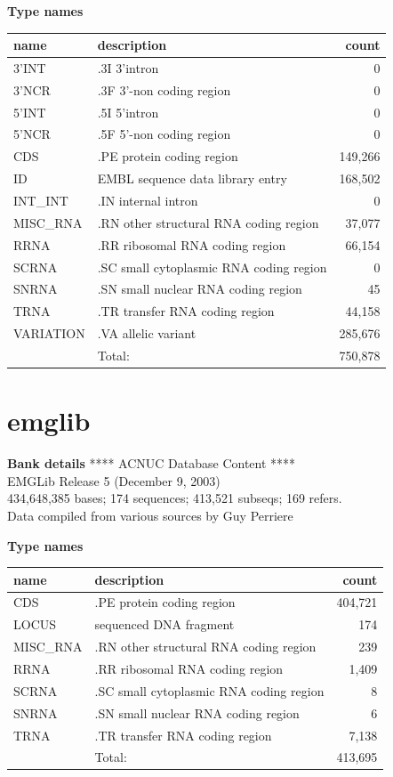 \documentclass{article}
\begin{document}
\begin{Schunk}
\textbf{Type names}
\noindent\begin{tabular}{llr}
\hline \hline
name & description & count \\
\hline
3'INT  &  .3I 3'intron  &  0 \\
3'NCR  &  .3F  3'-non coding region  &  0 \\
5'INT  &  .5I 5'intron  &  0 \\
5'NCR  &  .5F  5'-non coding region  &  0 \\
CDS  &  .PE protein coding region  &  149,266 \\
ID  &  EMBL sequence data library entry  &  168,502 \\
INT\_INT  &  .IN  internal intron  &  0 \\
MISC\_RNA  &  .RN other structural RNA coding region  &  37,077 \\
RRNA  &  .RR ribosomal RNA coding region  &  66,154 \\
SCRNA  &  .SC small cytoplasmic RNA coding region  &  0 \\
SNRNA  &  .SN small nuclear RNA coding region  &  45 \\
TRNA  &  .TR transfer RNA coding region  &  44,158 \\
VARIATION  &  .VA allelic variant  &  285,676 \\
\hline
 & Total: & 750,878 \\
\hline \hline
\end{tabular}

\section{ emglib }
\textbf{Bank details}
               ****     ACNUC Database Content      ****\\
                  EMGLib Release 5 (December 9, 2003)\\
434,648,385 bases; 174 sequences; 413,521 subseqs; 169 refers.\\
           Data compiled from various sources by Guy Perriere

\textbf{Type names}
\noindent\begin{tabular}{llr}
\hline \hline
name & description & count \\
\hline
CDS  &  .PE protein coding region  &  404,721 \\
LOCUS  &  sequenced DNA fragment  &  174 \\
MISC\_RNA  &  .RN other structural RNA coding region  &  239 \\
RRNA  &  .RR ribosomal RNA coding region  &  1,409 \\
SCRNA  &  .SC small cytoplasmic RNA coding region  &  8 \\
SNRNA  &  .SN small nuclear RNA coding region  &  6 \\
TRNA  &  .TR transfer RNA coding region  &  7,138 \\
\hline
 & Total: & 413,695 \\
\hline \hline
\end{tabular}


\end{Schunk}
\end{document}
